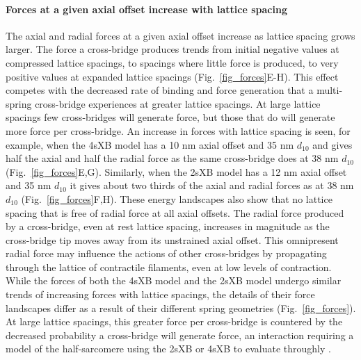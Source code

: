 \documentclass[]{article}
\begin{document}
\paragraph{Forces at a given axial offset increase with lattice spacing} %
The axial and radial forces at a given axial offset increase as lattice spacing grows larger.
The force a cross-bridge produces trends from initial negative values at compressed lattice spacings, to spacings where little force is produced, to very positive values at expanded lattice spacings (Fig.~\ref{fig_forces}E-H). 
This effect competes with the decreased rate of binding and force generation that a multi-spring cross-bridge experiences at greater lattice spacings. 
At large lattice spacings few cross-bridges will generate force, but those that do will generate more force per cross-bridge. 
An increase in forces with lattice spacing is seen, for example, when the 4sXB model has a 10 nm axial offset and 35 nm $d_{10}$  and gives half the axial and half the radial force as the same cross-bridge does at 38 nm $d_{10}$ (Fig.~\ref{fig_forces}E,G). 
Similarly, when the 2sXB model has a 12 nm axial offset and 35 nm $d_{10}$ it gives about two thirds of the axial and radial forces as at 38 nm $d_{10}$ (Fig.~\ref{fig_forces}F,H).  
These energy landscapes also show that no lattice spacing that is free of radial force at all axial offsets.  
The radial force produced by a cross-bridge, even at rest lattice spacing, increases in magnitude as the cross-bridge tip moves away from its unstrained axial offset. 
This omnipresent radial force may influence the actions of other cross-bridges by propagating through the lattice of contractile filaments, even at low levels of contraction.
While the forces of both the 4sXB model and the 2sXB model undergo similar trends of increasing forces with lattice spacings, the details of their force landscapes differ as a result of their different spring geometries (Fig.~\ref{fig_forces}). 
At large lattice spacings, this greater force per cross-bridge is countered by the decreased probability a cross-bridge will generate force, an interaction requiring a model of the half-sarcomere using the 2sXB or 4sXB to evaluate throughly \citep{Martyn2004}. 
\end{document}
